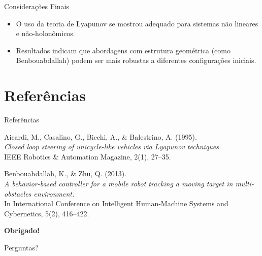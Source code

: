 \documentclass{beamer}
\begin{document}
\begin{frame}{Considerações Finais}
  \begin{itemize}
    \item O uso da teoria de Lyapunov se mostrou adequado para sistemas não lineares e não-holonômicos.
    \item Resultados indicam que abordagens com estrutura geométrica (como Benbouabdallah) podem ser mais robustas a diferentes configurações iniciais.
  \end{itemize}
\end{frame}
\section*{Referências}

\begin{frame}{Referências}
  \scriptsize
  \begin{thebibliography}{99}
    Aicardi, M., Casalino, G., Bicchi, A., \& Balestrino, A. (1995).\\
    \textit{Closed loop steering of unicycle-like vehicles via Lyapunov techniques.}\\
    IEEE Robotics \& Automation Magazine, 2(1), 27–35.

    Benbouabdallah, K., \& Zhu, Q. (2013).\\
    \textit{A behavior-based controller for a mobile robot tracking a moving target in multi-obstacles environment.}\\
    In International Conference on Intelligent Human-Machine Systems and Cybernetics, 5(2), 416–422.
  \end{thebibliography}
\end{frame}

\begin{frame}[standout]
  \Huge
  \textbf{Obrigado!}

  \vspace{0.5cm}
  \Large
  Perguntas?
\end{frame}

\end{document}
